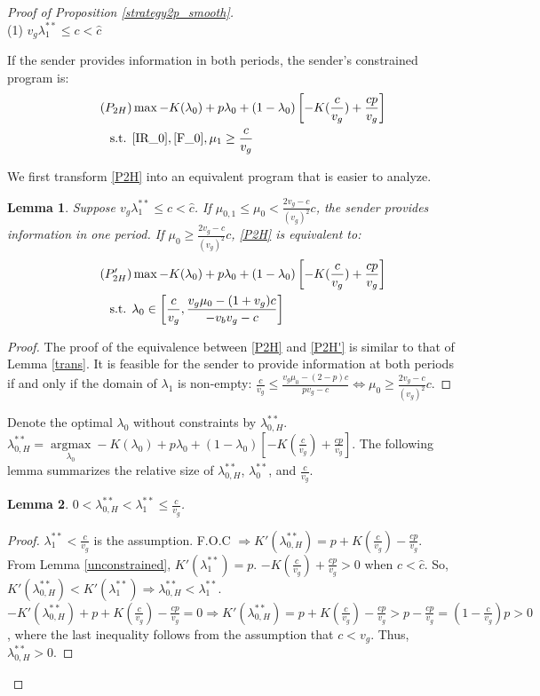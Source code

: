 \documentclass[11pt]{extarticle}
\newtheorem{lemma}{Lemma}
\DeclareMathOperator*{\argmax}{argmax}
\newcommand{\ra}{\Rightarrow}
\begin{document}
\begin{proof}[Proof of Proposition \ref{strategy2p_smooth}]
	~\\(1) $v_g\lambda_1^{**} \leq c < \widehat{c}$
	
	If the sender provides information in both periods, the sender's constrained program is:
	\begin{align}\tag{$P_{2H}$} \label{P2H}
	& \max -K(\lambda_0) + p \lambda_0 + (1-\lambda_0) \left[-K(\frac{c}{v_g})+\frac{cp}{v_g}\right] \nonumber\\
	\text{s.t. } &\eqref{IR_0},\eqref{F_0},\mu_1 \geq \frac{c}{v_g} \nonumber
	\end{align}
	
	We first transform \eqref{P2H} into an equivalent program that is easier to analyze.
	\begin{lemma}\label{trans2cl}
		Suppose $v_g\lambda_1^{**} \leq c < \widehat{c}$. If $\mu_{0,1} \leq \mu_0 < \frac{2v_g-c}{(v_g)^2} c$, the sender provides information in one period. If $\mu_0 \geq \frac{2v_g-c}{(v_g)^2} c$, \eqref{P2H} is equivalent to:
		\begin{align}\tag{$P'_{2H}$} \label{P2H'}
		& \max -K(\lambda_0) + p \lambda_0 + (1-\lambda_0) \left[-K(\frac{c}{v_g})+\frac{cp}{v_g}\right] \nonumber\\
		\text{s.t. } &\lambda_0 \in \left[\frac{c}{v_g}, \frac{v_g\mu_0-(1+v_g)c}{-v_b v_g-c}\right] \nonumber
		\end{align}
	\end{lemma}
	\begin{proof}
		The proof of the equivalence between \eqref{P2H} and \eqref{P2H'} is similar to that of Lemma \ref{trans}. It is feasible for the sender to provide information at both periods if and only if the domain of $\lambda_1$ is non-empty: $\frac{c}{v_g} \leq \frac{v_g\mu_0-(2-p)c}{pv_g-c} \Leftrightarrow \mu_0 \geq \frac{2v_g-c}{(v_g)^2} c$.
	\end{proof}
	Denote the optimal $\lambda_0$ without constraints by $\lambda_{0,H}^{**}$. $\lambda_{0,H}^{**} = \argmax\limits_{\lambda_0} -K(\lambda_0) + p \lambda_0 + (1-\lambda_0) \left[-K(\frac{c}{v_g})+\frac{cp}{v_g}\right]$. The following lemma summarizes the relative size of $\lambda_{0,H}^{**}$, $\lambda_0^{**}$, and $\frac{c}{v_g}$.
	
	\begin{lemma}\label{lambda2cl}
		$0 < \lambda_{0,H}^{**} < \lambda_1^{**} \leq \frac{c}{v_g}$.
	\end{lemma}
	\begin{proof}
		$\lambda_1^{**} < \frac{c}{v_g}$ is the assumption.
		F.O.C $\ra K'(\lambda_{0,H}^{**}) = p + K(\frac{c}{v_g}) - \frac{cp}{v_g}.$ From Lemma \ref{unconstrained}, $K'(\lambda_1^{**}) = p$. $-K(\frac{c}{v_g}) + \frac{cp}{v_g} > 0$ when $c < \widehat{c}$. So, $K'(\lambda_{0,H}^{**}) < K'(\lambda_1^{**}) \ra \lambda_{0,H}^{**} < \lambda_1^{**}$. $-K'(\lambda_{0,H}^{**}) + p + K(\frac{c}{v_g}) - \frac{cp}{v_g} = 0 \ra K'(\lambda_{0,H}^{**}) = p + K(\frac{c}{v_g}) - \frac{cp}{v_g} > p - \frac{cp}{v_g} = (1-\frac{c}{v_g}) p > 0$, where the last inequality follows from the assumption that $c < v_g$. Thus, $\lambda_{0,H}^{**} > 0$.
	\end{proof}
	

\end{proof}
\end{document}

